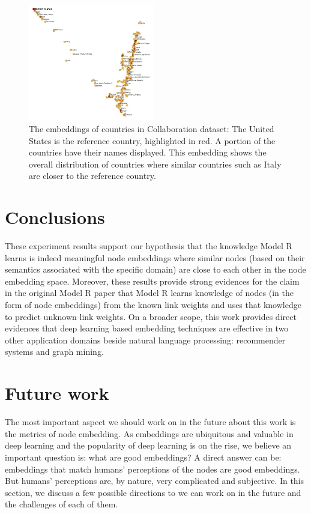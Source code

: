 \documentclass[conference]{IEEEtran}
\begin{document}
\begin{figure}[!ht]\centering
	\includegraphics[width=0.49\textwidth]{countries}
	\caption{
		The embeddings of countries in Collaboration dataset:
		The United States is the reference country, highlighted in red.
		A portion of the countries have their names displayed.
		This embedding shows the overall distribution of countries where similar countries such as Italy are closer to the reference country.
	}
	\label{fig:countries}
\end{figure}

\section{Conclusions}
These experiment results support our hypothesis that the knowledge Model R learns is indeed meaningful node embeddings where similar nodes (based on their semantics associated with the specific domain) are close to each other in the node embedding space.
Moreover, these results provide strong evidences for the claim in the original Model R paper that Model R learns knowledge of nodes (in the form of node embeddings) from the known link weights and uses that knowledge to predict unknown link weights.
On a broader scope, this work provides direct evidences that deep learning based embedding techniques are effective in two other application domains beside natural language processing: recommender systems and graph mining.

\section{Future work}
The most important aspect we should work on in the future about this work is the metrics of node embedding.
As embeddings are ubiquitous and valuable in deep learning and the popularity of deep learning is on the rise, we believe an important question is: what are good embeddings?
A direct answer can be: embeddings that match humans' perceptions of the nodes are good embeddings.
But humans' perceptions are, by nature, very complicated and subjective.
In this section, we discuss a few possible directions to we can work on in the future and the challenges of each of them.
\end{document}
